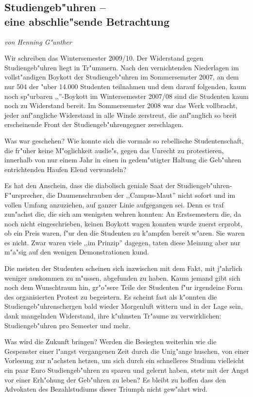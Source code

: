 \subsection[Studiengeb"uhren]{Studiengeb"uhren --\\ eine abschlie"sende
Betrachtung}
\emph{von Henning G"unther}

\begin{figure*}[b]
\end{figure*}

Wir schreiben das Wintersemester 2009/10.
Der Widerstand gegen Studiengeb"uhren liegt in Tr"ummern.
Nach den vernichtenden Niederlagen im voll\-st"an\-di\-gen Boykott der
Studiengeb"uhren im Sommersemster 2007, an dem nur 504 der "uber 14.000 Studenten teilnahmen und dem darauf folgenden, kaum noch sp"urbaren ,,''-Boykott im Wintersemester 2007/08 sind die Studenten kaum noch zu Widerstand bereit. Im Sommersemster 2008 war das Werk vollbracht, jeder anf"angliche Widerstand in alle Winde zerstreut, die anf"anglich so breit erscheinende Front der Studiengeb"uhrengegner zerschlagen.

Was war geschehen?
Wie konnte sich die vormals so rebellische Studentenschaft, die fr"uher keine M"oglichkeit auslie"s, gegen das Unrecht zu protestieren, innerhalb von nur einem Jahr in einen in gedem"utigter Haltung die Geb"uhren entrichtenden Haufen Elend verwandeln?

Es hat den Anschein, dass die diabolisch geniale Saat der
Studiengeb"uhren-F"ursprecher, die Daumenschrauben der ,,Campus-Maut'' nicht
sofort und im vollen Umfang anzuziehen, auf ganzer Linie aufgegangen sei. Denn es traf zun"achst die, die sich am wenigsten wehren konnten: An Erstsemestern die, da noch nicht eingeschrieben, keinen Boykott wagen
konnten wurde zuerst erprobt, ob  ein Preis waren, f"ur den die Studenten zu k"ampfen bereit w"aren. Sie waren es nicht.
Zwar waren viele ,,im Prinzip'' dagegen, taten diese Meinung aber nur m"a"sig
auf den wenigen Demonstrationen kund.

Die meisten der Studenten scheinen sich inzwischen mit dem Fakt, mit j"ahrlich
 weniger auskommen zu m"ussen, abgefunden zu haben. Kaum jemand gibt sich noch dem Wunschtraum hin, gr"o"sere Teile der Studenten f"ur irgendeine Form des organisierten Protest zu begeistern.
Es scheint fast als k"onnten die Studiengeb"uhrenschergen bald wieder Morgenluft wittern und in der Lage sein, dank mangelnden Widerstand, ihre k"uhnsten Tr"aume zu verwirklichen:  Studiengeb"uhren pro Semester und mehr.

Was wird die Zukunft bringen?
Werden die Besiegten weiterhin wie die Gespenster einer l"angst vergangenen Zeit durch die Unig"ange huschen, von einer Vorlesung zur n"achsten hetzen, um sich durch ein schnelleres Studium vielleicht ein paar Euro Studiengeb"uhren zu sparen und gelernt haben, stets mit der Angst vor einer Erh"ohung der Geb"uhren zu leben?
Es bleibt zu hoffen dass den Advokaten des Bezahlstudiums dieser Triumph nicht gew"ahrt wird.
